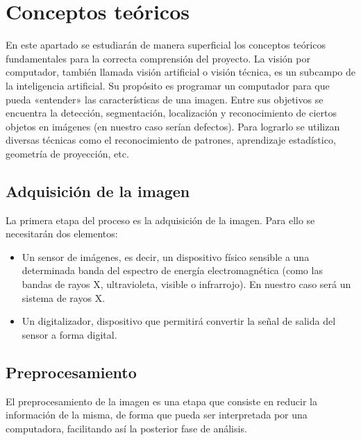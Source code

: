 \chapter{Conceptos teóricos}

En este apartado se estudiarán de manera superficial los conceptos teóricos fundamentales para
la correcta comprensión del proyecto.
La visión por computador, también llamada visión artificial o visión técnica, es un subcampo de
la inteligencia artificial. Su propósito es programar un computador para que pueda «entender» las características de una imagen.
Entre sus objetivos se encuentra la detección, segmentación, localización y reconocimiento de
ciertos objetos en imágenes (en nuestro caso serían defectos). Para lograrlo se utilizan diversas técnicas como el reconocimiento de patrones, aprendizaje estadístico, geometría de proyección, etc.


\section{Adquisición de la imagen}
La primera etapa del proceso es la adquisición de la imagen. Para ello se necesitarán dos elementos:

\begin{itemize}

\item Un sensor de imágenes, es decir, un dispositivo físico sensible a una determinada banda del espectro de energía electromagnética (como las bandas de rayos X, ultravioleta, visible o
infrarrojo). En nuestro caso será un sistema de rayos X.

\item Un digitalizador, dispositivo que permitirá convertir la señal de salida del sensor a forma digital.

\end{itemize}
\newpage


\section{Preprocesamiento}
El preprocesamiento de la imagen es una etapa que consiste en reducir la información de la
misma, de forma que pueda ser interpretada por una computadora, facilitando así la posterior fase de análisis.

